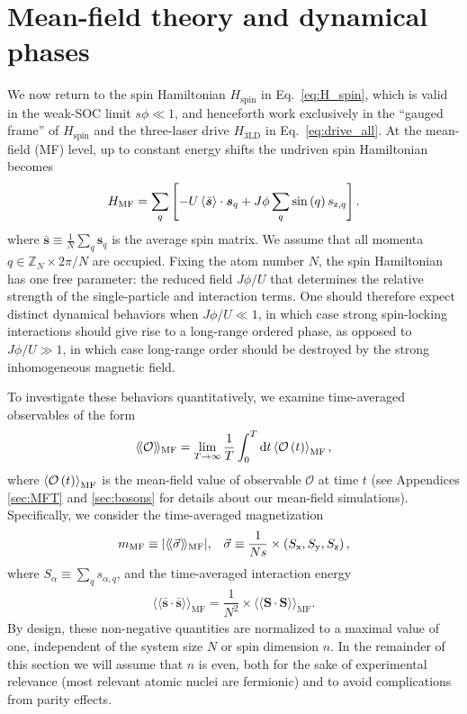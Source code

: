 \documentclass[nofootinbib,twocolumn]{revtex4-2}
\renewcommand{\t}{\text} %
\newcommand{\f}[2]{\dfrac{#1}{#2}} %
\newcommand{\p}[1]{\left(#1\right)} %
\renewcommand{\sp}[1]{\left[#1\right]} %
\newcommand{\bk}{\Braket} %
\renewcommand{\v}{\bm} %
\renewcommand{\c}{\cdot} %
\renewcommand{\dd}{\text{d}} %
\newcommand{\bbk}[1]{\langle\!\langle #1 \rangle\!\rangle}
\newcommand{\1}{\mathds{1}}
\newcommand{\x}{\text{x}}
\newcommand{\y}{\text{y}}
\newcommand{\z}{\text{z}}
\newcommand{\ZZ}{\mathbb{Z}}
\renewcommand{\O}{\mathcal{O}}
\newcommand{\MF}{\text{MF}}
\renewcommand{\ss}{\bar{\v s}\c\bar{\v s}}
\begin{document}
\section{Mean-field theory and dynamical phases}
\label{sec:mean_field}

We now return to the spin Hamiltonian $H_{\t{spin}}$ in Eq.~\eqref{eq:H_spin}, which is valid in the weak-SOC limit $s\phi\ll1$, and henceforth work exclusively in the ``gauged frame'' of $H_{\t{spin}}$ and the three-laser drive $H_{\t{3LD}}$ in Eq.~\eqref{eq:drive_all}.
At the mean-field (MF) level, up to constant energy shifts the undriven spin Hamiltonian becomes
\begin{align}
  H_\MF = \sum_q\sp{-U\bk{\bar{\v s}}\c\v s_q
    + J\phi \sum_q \sin\p{q} s_{\z,q}}.
  \label{eq:H_MF}
\end{align}
where $\bar{\v s}\equiv\frac1N\sum_q\v s_q$ is the average spin matrix.
We assume that all momenta $q\in\ZZ_N\times 2\pi/N$ are occupied.
Fixing the atom number $N$, the spin Hamiltonian has one free parameter: the reduced field $J\phi/U$ that determines the relative strength of the single-particle and interaction terms.
One should therefore expect distinct dynamical behaviors when $J\phi/U\ll1$, in which case strong spin-locking interactions should give rise to a long-range ordered phase, as opposed to $J\phi/U\gg1$, in which case long-range order should be destroyed by the strong inhomogeneous magnetic field.

To investigate these behaviors quantitatively, we examine time-averaged observables of the form
\begin{align}
  \bbk{\O}_\MF = \lim_{T\to\infty} \f1T \int_0^T \dd t \bk{\O\p{t}}_\MF,
\end{align}
where $\bk{\O\p{t}}_\MF$ is the mean-field value of observable $\O$ at time $t$ (see Appendices \ref{sec:MFT} and \ref{sec:bosons} for details about our mean-field simulations).
Specifically, we consider the time-averaged magnetization
\begin{align}
  m_\MF \equiv \abs{\bbk{\vec\sigma}_\MF},
  &&
  \vec\sigma \equiv \f1{Ns} \times \p{S_\x,S_\y,S_\z},
\end{align}
where $S_\alpha \equiv \sum_q s_{\alpha,q}$, and the time-averaged interaction energy
\begin{align}
  \bbk{\ss}_\MF = \f1{N^2} \times \bbk{\v S\c\v S}_\MF.
\end{align}
By design, these non-negative quantities are normalized to a maximal value of one, independent of the system size $N$ or spin dimension $n$.
In the remainder of this section we will assume that $n$ is even, both for the sake of experimental relevance (most relevant atomic nuclei are fermionic) and to avoid complications from parity effects.
\end{document}
